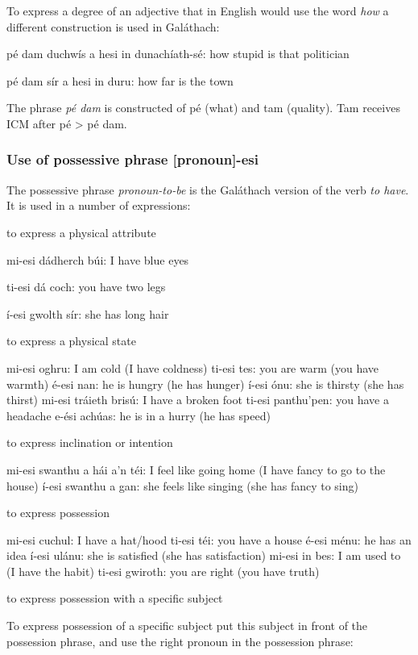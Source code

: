 To express a degree of an adjective that in English would use the word \textit{how} a different construction is used in Gal\'{a}thach:

p\'{e} dam duchw\'{i}s a hesi in dunach\'{i}ath-s\'{e}: how stupid is that politician

p\'{e} dam s\'{i}r a hesi in duru: how far is the town

The phrase \textit{p\'{e} dam} is constructed of p\'{e} (what) and tam (quality). Tam receives ICM after p\'{e} > p\'{e} dam.

\subsubsection{Use of possessive phrase [pronoun]-esi}

The possessive phrase \textit{pronoun-to-be} is the Gal\'{a}thach version of the verb \textit{to have}. It is used in a number of expressions:

    to express a physical attribute

mi-esi d\'{a}dherch b\'{u}i: I have blue eyes

ti-esi d\'{a} coch: you have two legs

\'{i}-esi gwolth s\'{i}r: she has long hair

    to express a physical state

mi-esi oghru: I am cold (I have coldness)
ti-esi tes: you are warm (you have warmth)
\'{e}-esi nan: he is hungry (he has hunger)
\'{i}-esi \'{o}nu: she is thirsty (she has thirst)
mi-esi tr\'{a}ieth bris\'{u}: I have a broken foot
ti-esi panthu'pen: you have a headache
e-\'{e}si ach\'{u}as: he is in a hurry (he has speed)

    to express inclination or intention

mi-esi swanthu a h\'{a}i a'n t\'{e}i: I feel like going home (I have fancy to go to the house)
\'{i}-esi swanthu a gan: she feels like singing (she has fancy to sing)

    to express possession

mi-esi cuchul: I have a hat/hood
ti-esi t\'{e}i: you have a house
\'{e}-esi m\'{e}nu: he has an idea
\'{i}-esi ul\'{a}nu: she is satisfied (she has satisfaction)
mi-esi in bes: I am used to (I have the habit)
ti-esi gwiroth: you are right (you have truth)

    to express possession with a specific subject

To express possession of a specific subject put this subject in front of the possession phrase, and use the right pronoun in the possession phrase:

